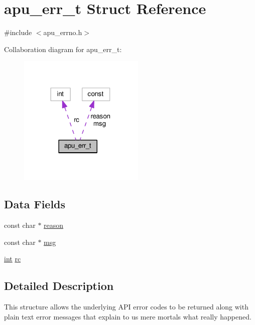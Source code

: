 \hypertarget{structapu__err__t}{}\section{apu\+\_\+err\+\_\+t Struct Reference}
\label{structapu__err__t}


{\ttfamily \#include $<$apu\+\_\+errno.\+h$>$}



Collaboration diagram for apu\+\_\+err\+\_\+t\+:
\nopagebreak
\begin{figure}[H]
\begin{center}
\leavevmode
\includegraphics[width=170pt]{structapu__err__t__coll__graph}
\end{center}
\end{figure}
\subsection*{Data Fields}
\begin{DoxyCompactItemize}
\item 
const char $\ast$ \hyperlink{structapu__err__t_a16327ba93834bf8f4a13663a714caa0b}{reason}
\item 
const char $\ast$ \hyperlink{structapu__err__t_a00fa3bec74e3dff959ca0d774c35e8de}{msg}
\item 
\hyperlink{pcre_8txt_a42dfa4ff673c82d8efe7144098fbc198}{int} \hyperlink{structapu__err__t_a37afb348f7541d37cce9478769f02304}{rc}
\end{DoxyCompactItemize}


\subsection{Detailed Description}
This structure allows the underlying A\+PI error codes to be returned along with plain text error messages that explain to us mere mortals what really happened. 

